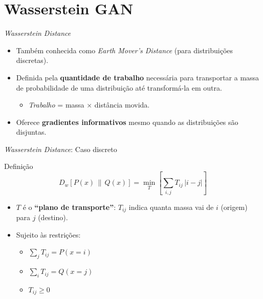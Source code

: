 \documentclass[aspectratio=169,xcolor=dvipsnames]{beamer}
\begin{document}
  \section{Wasserstein GAN}

  \begin{frame}{\textit{Wasserstein Distance}}
    \begin{itemize}
      \item Também conhecida como \textit{Earth Mover's Distance} (para
      distribuições discretas).
      \item Definida pela \textbf{quantidade de trabalho} necessária
      para transportar a massa de probabilidade de uma distribuição até
      transformá-la em outra.
      \begin{itemize}
        \item \emph{Trabalho} = massa $\times$ distância movida.
      \end{itemize}
      \item Oferece \textbf{gradientes informativos} mesmo quando as
      distribuições são disjuntas.
    \end{itemize}
  \end{frame}

  \begin{frame}{\textit{Wasserstein Distance}: Caso discreto}
    \begin{block}{Definição}
      \[
        D_{w}\!\left[P(x)\,\|\,Q(x)\right] =
        \min_{T}\!\left[\sum_{i,j} T_{ij}\,|i-j|\right]
      \]
    \end{block}
    \begin{itemize}
      \item $T$ é o \textbf{``plano de transporte''}: $T_{ij}$ indica
      quanta massa vai de $i$ (origem) para $j$ (destino).
      \item Sujeito às restrições:
      \begin{itemize}
        \item $\sum_{j} T_{ij} = P(x=i)$
        \item $\sum_{i} T_{ij} = Q(x=j)$
        \item $T_{ij} \geq 0$
      \end{itemize}
    \end{itemize}
  \end{frame}
\end{document}
